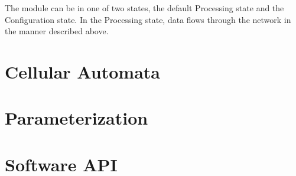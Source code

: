 The module can be in one of two states, the default Processing state and the
Configuration state. In the Processing state, data flows through the network in
the manner described above. 



\clearpage

\section{Cellular Automata}

\section{Parameterization}

\section{Software API}

\cleardoublepage
